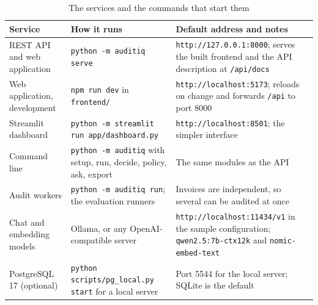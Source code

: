 \documentclass[11pt,a4paper]{article}
\begin{document}
\begin{table}[htbp]
\caption{The services and the commands that start them}
\label{tab:services}
\centering
\small
\begin{tabular}{L{3.6cm}L{5.6cm}L{6.1cm}}
\toprule
Service & How it runs & Default address and notes \\
\midrule
REST API and web application & \texttt{python -m auditiq serve} & \texttt{http://127.0.0.1:8000}; serves the built frontend and the API description at \texttt{/api/docs} \\
Web application, development & \texttt{npm run dev} in \texttt{frontend/} & \texttt{http://localhost:5173}; reloads on change and forwards \texttt{/api} to port 8000 \\
Streamlit dashboard & \texttt{python -m streamlit run app/dashboard.py} & \texttt{http://localhost:8501}; the simpler interface \\
Command line & \texttt{python -m auditiq} with setup, run, decide, policy, ask, export & The same modules as the API \\
Audit workers & \texttt{python -m auditiq run}; the evaluation runners & Invoices are independent, so several can be audited at once \\
Chat and embedding models & Ollama, or any OpenAI-compatible server & \texttt{http://localhost:11434/v1} in the sample configuration; \texttt{qwen2.5:7b-ctx12k} and \texttt{nomic-embed-text} \\
PostgreSQL 17 (optional) & \texttt{python scripts/pg\_local.py start} for a local server & Port 5544 for the local server; SQLite is the default \\
\bottomrule
\end{tabular}
\end{table}

\clearpage
\end{document}
